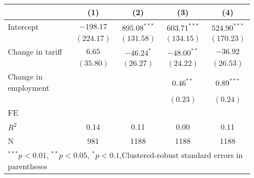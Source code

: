 
\begin{tabular}{l c c c c }
\hline
 & (1) & (2) & (3) & (4) \\
\hline
Intercept & $-198.17$  & $895.08^{***}$ & $603.71^{***}$ & $524.90^{***}$ \\
            & $(224.17)$ & $(131.58)$     & $(134.15)$     & $(170.23)$     \\
Change in tariff     & $6.65$     & $-46.24^{*}$   & $-48.00^{**}$  & $-36.92$       \\
            & $(35.80)$  & $(26.27)$      & $(24.22)$      & $(26.53)$      \\
Change in employment     &            &                & $0.46^{**}$    & $0.89^{***}$   \\
            &            &                & $(0.23)$       & $(0.24)$       \\
\hline
FE          &                &                &                &                \\ 
\hline
$R^2$       & 0.14       & 0.11           & 0.00           & 0.11           \\
N           & 981        & 1188           & 1188           & 1188           \\
\hline
\multicolumn{5}{l}{\scriptsize{$^{***}p<0.01$, $^{**}p<0.05$, $^*p<0.1$,Clustered-robust standard errors in parentheses}}
\end{tabular}
